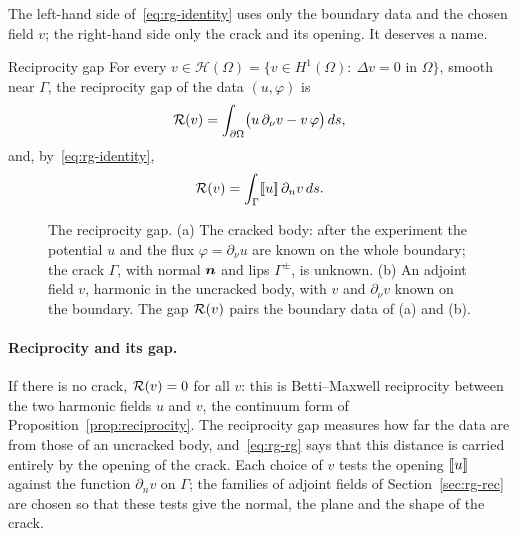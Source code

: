 The left-hand side of~\eqref{eq:rg-identity} uses only the boundary data and the chosen field $v$; the right-hand side only the crack and its opening. It deserves a name.

\begin{gbox}{Reciprocity gap}
For every $v\in\mathcal H(\Omega)=\{v\in H^1(\Omega):\ \Delta v=0\text{ in }\Omega\}$, smooth near $\Gamma$, the reciprocity gap of the data $(u,\varphi)$ is
\begin{equation}\label{eq:rg-rgdef}
\mathcal{R}(v)=\int_{\partial\Omega}\bigl(u\,\partial_\nu v-v\,\varphi\bigr)\,ds ,
\end{equation}
and, by~\eqref{eq:rg-identity},
\begin{equation}\label{eq:rg-rg}
\mathcal{R}(v)=\int_\Gamma[\![u]\!]\,\partial_n v\,ds .
\end{equation}
\end{gbox}

\begin{figure}[h]
\centering

\caption{The reciprocity gap. (a) The cracked body: after the experiment the
potential $u$ and the flux $\varphi=\partial_\nu u$ are known on the whole
boundary; the crack $\Gamma$, with normal $\bm{n}$ and lips $\Gamma^\pm$, is
unknown. (b) An adjoint field $v$, harmonic in the uncracked body, with $v$
and $\partial_\nu v$ known on the boundary. The gap $\mathcal{R}(v)$ pairs the
boundary data of (a) and (b).}
\label{fig:rg-rg}
\end{figure}

\paragraph{Reciprocity and its gap.} If there is no crack, $\mathcal{R}(v)=0$ for all $v$: this is Betti--Maxwell reciprocity between the two harmonic fields $u$ and $v$, the continuum form of Proposition~\ref{prop:reciprocity}. The reciprocity gap measures how far the data are from those of an uncracked body, and~\eqref{eq:rg-rg} says that this distance is carried entirely by the opening of the crack. Each choice of $v$ tests the opening $[\![u]\!]$ against the function $\partial_nv$ on $\Gamma$; the families of adjoint fields of Section~\ref{sec:rg-rec} are chosen so that these tests give the normal, the plane and the shape of the crack.

